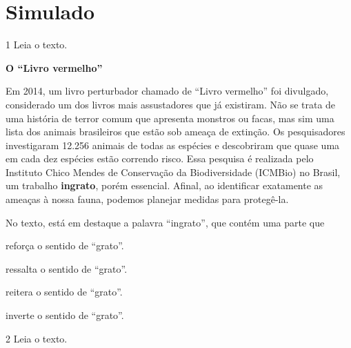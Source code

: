 \chapter[Simulado 3]{Simulado}

\vspace*{-1cm}

\num{1} Leia o texto.

\begin{myquote}
\textbf{O ``Livro vermelho''}

Em 2014, um livro perturbador chamado de ``Livro vermelho'' foi divulgado, considerado um dos livros mais assustadores que já existiram. Não se trata de uma história de terror comum que apresenta monstros ou facas, mas sim uma lista dos animais brasileiros que estão sob ameaça de extinção. Os pesquisadores investigaram 12.256 animais de todas as espécies e descobriram que quase uma em cada dez espécies estão correndo risco. Essa pesquisa é realizada pelo Instituto Chico Mendes de Conservação da Biodiversidade (ICMBio) no Brasil, um trabalho \textbf{ingrato}, porém essencial. Afinal, ao identificar exatamente as ameaças à nossa fauna, podemos planejar medidas para protegê-la.

\end{myquote}

No texto, está em destaque a palavra ``ingrato'', que contém uma parte que

\begin{escolha}
\item reforça o sentido de ``grato''.

\item ressalta o sentido de ``grato''.

\item reitera o sentido de ``grato''.

\item inverte o sentido de ``grato''.
\end{escolha}

\num{2} Leia o texto.

